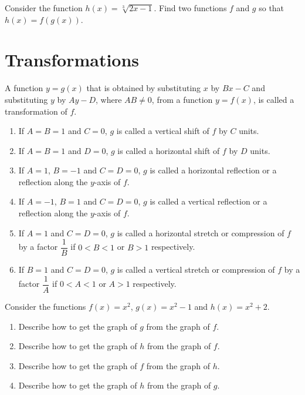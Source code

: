\begin{exercise}
  Consider the function $h(x)=\sqrt[3]{2x-1}$. Find two functions $f$ and $g$ so that $h(x)=f(g(x))$.
\end{exercise}

\newpage

\section{Transformations}

\begin{definition}
  A function $y=g(x)$ that is obtained by substituting $x$ by $Bx-C$ and substituting $y$ by $Ay-D$, where $AB\ne 0$, from a function $y=f(x)$, is called a transformation of $f$.
  
  \begin{enumerate}
    \item If $A=B=1$ and $C=0$, $g$ is called a vertical shift of $f$ by $C$ units.
    \item If $A=B=1$ and $D=0$, $g$ is called a horizontal shift of $f$ by $D$ units.
    \item If $A=1$, $B=-1$ and $C=D=0$, $g$ is called a horizontal reflection or a reflection along the $y$-axis of $f$.
    \item If $A=-1$, $B=1$ and $C=D=0$, $g$ is called a vertical reflection or a reflection along the $y$-axis of $f$.
    \item If $A=1$ and $C=D=0$, $g$ is called a horizontal stretch or compression of $f$ by a factor $\dfrac{1}{B}$ if $0<B<1$ or $B>1$ respectively.
    \item If $B=1$ and $C=D=0$, $g$ is called a vertical stretch or compression of $f$ by a factor $\dfrac{1}{A}$ if $0<A<1$ or $A>1$ respectively.
  \end{enumerate}
\end{definition}


\begin{example}
  Consider the functions $f(x)=x^2$, $g(x)=x^2-1$ and $h(x)=x^2+2$.
  \begin{enumerate}
    \item Describe how to get the graph of $g$ from the graph of $f$.
    \vspace*{3\baselineskip}
    \item Describe how to get the graph of $h$ from the graph of $f$.
    \vspace*{3\baselineskip}
    \item Describe how to get the graph of $f$ from the graph of $h$.
    \vspace*{3\baselineskip}
    \item Describe how to get the graph of $h$ from the graph of $g$.
    \vspace*{3\baselineskip}
  \end{enumerate}
\end{example}

